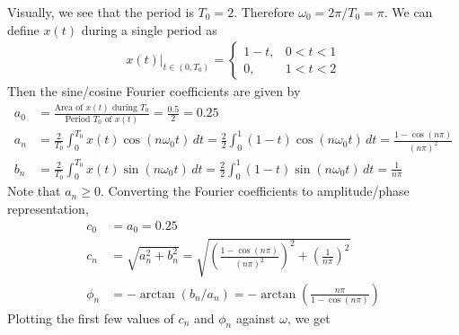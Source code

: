 \documentclass{report}
\begin{document}
\begin{solution}
    Visually, we see that the period is $T_0=2$. Therefore $\omega_0=2\pi/T_0 = \pi$. 
    We can define $x(t)$ during a single period as 
    \begin{align*}
        x(t)\bigg|_{t\in(0,T_0)} = 
        \begin{cases}
            1-t, & 0<t<1 \\
            0, & 1<t<2
        \end{cases}
    \end{align*}
    Then the sine/cosine Fourier coefficients are given by 
    \begin{align*}
        a_0 &= \frac{\text{Area of } x(t) \text{ during } T_0}{\text{Period } T_0 \text{ of } x(t)} = \frac{0.5}{2} = 0.25 \\
        a_n &= \frac{2}{T_0} \int_{0}^{T_0} x(t)\cos(n\omega_0 t) \,dt = \frac{2}{2} \int_{0}^{1} (1-t)\cos(n\omega_0 t) \,dt = \frac{1-\cos(n\pi)}{(n\pi)^2} \\
        b_n &= \frac{2}{T_0} \int_{0}^{T_0} x(t)\sin(n\omega_0 t) \,dt = \frac{2}{2} \int_{0}^{1} (1-t)\sin(n\omega_0 t) \,dt = \frac{1}{n\pi}
    \end{align*}
    Note that $a_n \geq 0$. Converting the Fourier coefficients to amplitude/phase representation, 
    \begin{align*}
        c_0 &= a_0 = 0.25 \\
        c_n &= \sqrt{a_n^2 + b_n^2} = \sqrt{\left(\frac{1-\cos(n\pi)}{(n\pi)^2}\right)^2 + \left(\frac{1}{n\pi}\right)^2} \\
        \phi_n &= -\arctan(b_n/a_n) = -\arctan\left(\frac{n\pi}{1-\cos(n\pi)}\right)
    \end{align*}
    Plotting the first few values of $c_n$ and $\phi_n$ against $\omega$, we get \\
    \begin{center}
\end{center}
\end{solution}
\end{document}
